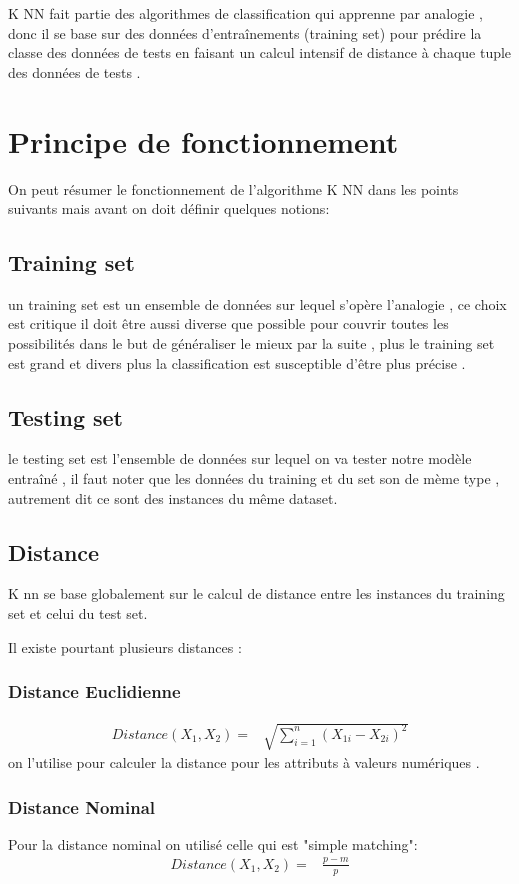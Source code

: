\documentclass[12pt,a4paper,oneside]{book}
\begin{document}
	K NN fait partie des algorithmes de classification qui apprenne par analogie , donc il  se base sur des données d'entraînements (training set)
	pour prédire la classe des données de tests en faisant un calcul intensif de distance à chaque tuple des données de tests .
	
	\section{Principe de fonctionnement}
	On peut résumer le fonctionnement de l'algorithme K NN  dans les points suivants mais avant on doit définir quelques notions: 
	\subsection{Training set}
	un training set est un ensemble de données sur lequel s'opère l'analogie , ce choix est critique il doit être aussi diverse que possible pour couvrir toutes les possibilités dans le but de généraliser le  mieux par la suite , plus le training set est grand et divers plus la classification est susceptible d'être plus précise .
	\subsection{Testing set}
	le testing set est l'ensemble de données sur lequel on va tester notre modèle entraîné , il faut noter que les données du training et du set son de mème type , autrement dit ce sont des instances du même dataset.
	
	\subsection{Distance}
	K nn se base globalement sur le calcul de distance entre les instances du training set et celui du test set.
	
	Il existe pourtant plusieurs distances :
	\subsubsection{Distance Euclidienne}
	\begin{equation*}
	\begin{split}
	Distance(X_{1},X_{2}) =& \sqrt{ \sum_{i=1}^{n} (X_{1i} - X_{2i})^2}
	\end{split}
	\end{equation*}
	on l'utilise pour calculer la distance pour les attributs à valeurs numériques .
	\subsubsection{Distance Nominal}
	Pour la distance nominal on utilisé celle qui est "simple matching":
	\begin{equation}
	\begin{split}
	Distance(X_{1},X_{2}) =& \frac{p-m}{p}
	\end{split}
	\end{equation}
	
\end{document}
